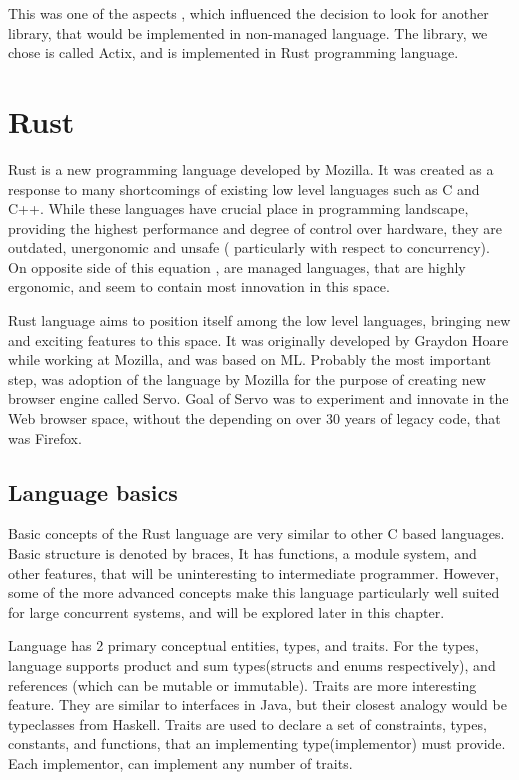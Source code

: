 This was one of the aspects , which influenced the decision to look for another library, that would be implemented in
non-managed language. The library, we chose is called Actix\cite{web:actix}, and is implemented in Rust\cite{Blandy:2015:RPL:3019371}
programming language.

\section{Rust}
Rust is a new programming language developed by Mozilla. It was created as a response to many shortcomings of existing low level
languages such as C and C++. While these languages have crucial place in programming landscape, providing the highest performance and
degree of control over hardware, they are outdated, unergonomic and unsafe ( particularly with respect to concurrency). On opposite
side of this equation , are managed languages, that are highly ergonomic, and seem to contain most innovation in this space.

Rust language aims to position itself among the low level languages, bringing new and exciting features to this space.
It was originally developed by Graydon Hoare\cite{web:rust_progress} while working at Mozilla, and was based on
ML. Probably the most important step, was adoption of the language by Mozilla for the purpose of creating new browser engine
called Servo\cite{proc:servo}. Goal of Servo was to experiment and innovate in the Web browser space, without
the depending on over 30 years of legacy code, that was Firefox.

\subsection{Language basics}
Basic concepts of the Rust language are very similar to other C based languages. Basic structure is denoted by braces,
It has functions, a module system, and other features, that will be uninteresting to intermediate programmer.
However, some of the more advanced concepts make this language particularly well suited for large concurrent systems, and
will be explored later in this chapter.

Language has 2 primary conceptual entities, types, and traits.
For the types, language supports product and sum types(structs and enums respectively), and references (which can be mutable or immutable).
Traits are more interesting feature. They are similar to interfaces in Java, but their closest analogy would be typeclasses from Haskell.
Traits are used to declare a set of constraints, types, constants, and functions, that an implementing type(implementor) must provide.
Each implementor, can implement any number of traits.

